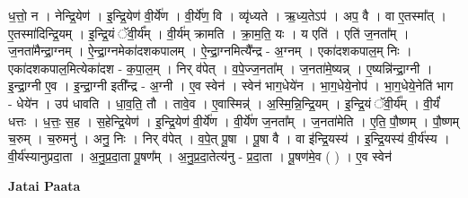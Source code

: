 \documentclass[17pt]{extarticle}
\begin{document}
ध॒त्तो॒ न । नेन्द्रि॒येण॑ । इ॒न्द्रि॒येण॑ वी॒र्ये॑ण । वी॒र्ये॑ण॒ वि । व्यृ॑ध्यते । ऋ॒ध्य॒तेऽप॑ । अप॒ वै । वा ए॒तस्मा᳚त् । ए॒तस्मा॑दिन्द्रि॒यम् । इ॒न्द्रि॒यं ॅवी॒र्य᳚म् । वी॒र्य॑म् क्रामति । क्रा॒म॒ति॒ यः । य एति॑ । एति॑ ज॒नता᳚म् । ज॒नता॑मैन्द्रा॒ग्नम् । ऐ॒न्द्रा॒ग्नमेका॑दशकपालम् । ऐ॒न्द्रा॒ग्नमित्यै᳚न्द्र - अ॒ग्नम् । एका॑दशकपाल॒म् निः । एका॑दशकपाल॒मित्येका॑दश - क॒पा॒ल॒म् । निर् व॑पेत् । व॒पे॒ज्ज॒नता᳚म् । ज॒नता॑मे॒ष्यन्न् । ए॒ष्यन्नि॑न्द्रा॒ग्नी । इ॒न्द्रा॒ग्नी ए॒व । इ॒न्द्रा॒ग्नी इती᳚न्द्र - अ॒ग्नी । ए॒व स्वेन॑ । स्वेन॑ भाग॒धेये॑न । भा॒ग॒धेये॒नोप॑ । भा॒ग॒धेये॒नेति॑ भाग - धेये॑न । उप॑ धावति । धा॒व॒ति॒ तौ । तावे॒व । ए॒वास्मिन्न्॑ । अ॒स्मि॒न्नि॒न्द्रि॒यम् । इ॒न्द्रि॒यं ॅवी॒र्य᳚म् । वी॒र्यं॑ धत्तः । ध॒त्तः॒ स॒ह । स॒हेन्द्रि॒येण॑ । इ॒न्द्रि॒येण॑ वी॒र्ये॑ण । वी॒र्ये॑ण ज॒नता᳚म् । ज॒नता॑मेति । ए॒ति॒ पौ॒ष्णम् । पौ॒ष्णम् च॒रुम् । च॒रुमनु॑ । अनु॒ निः । निर् व॑पेत् । व॒पे॒त् पू॒षा । पू॒षा वै । वा इ॑न्द्रि॒यस्य॑ । इ॒न्द्रि॒यस्य॑ वी॒र्य॑स्य । वी॒र्य॑स्यानुप्रदा॒ता । अ॒नु॒प्र॒दा॒ता पू॒षण᳚म् । अ॒नु॒प्र॒दा॒तेत्य॑नु - प्र॒दा॒ता । पू॒षण॑मे॒व ( ) । ए॒व स्वेन॑ \newline

\textbf{Jatai Paata} \newline
\end{document}
